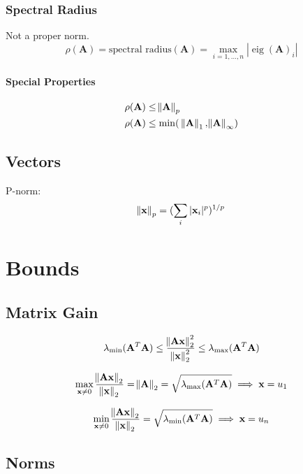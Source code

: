 \documentclass{book}
\newcommand{\mA}{\mathbf{A}}
\newcommand{\vx}{\mathbf{x}}
\DeclareMathOperator{\eig}{eig}
\begin{document}
\subsection{Spectral Radius}
Not a proper norm.
\begin{equation}
\rho(\mA)=\textrm{spectral radius}(\mA)=\max_{i=1,\ldots,n} | \eig(\mA)_i |
\end{equation}

\subsubsection{Special Properties}
\begin{align}
\rho(\mA) &\le \norm{\mA}_p \\
\rho(\mA) &\le \min(~\norm{\mA}_1, \norm{\mA}_\infty) \\
\end{align}


\section{Vectors}

P-norm:
\begin{equation}
\norm{\vx}_p = (\sum_i |\vx_i|^p)^{1/p}
\end{equation}

\chapter{Bounds}

\section{Matrix Gain}
\begin{equation}
\lambda_\textrm{min}(\mA^T\mA)\le \frac{\norm{\mA\vx}_2^2}{\norm{\vx}_2^2}\le\lambda_\textrm{max}(\mA^T\mA)
\end{equation}

\begin{equation}
\max_{\vx\ne0} \frac{\norm{\mA\vx}_2}{\norm{\vx}_2}=\norm{\mA}_2=\sqrt{\lambda_\textrm{max}(\mA^T\mA)}\implies\vx=u_1
\end{equation}

\begin{equation}
\min_{\vx\ne0} \frac{\norm{\mA\vx}_2}{\norm{\vx}_2}=\sqrt{\lambda_\textrm{min}(\mA^T\mA)}\implies\vx=u_n
\end{equation}


\section{Norms}
\end{document}
